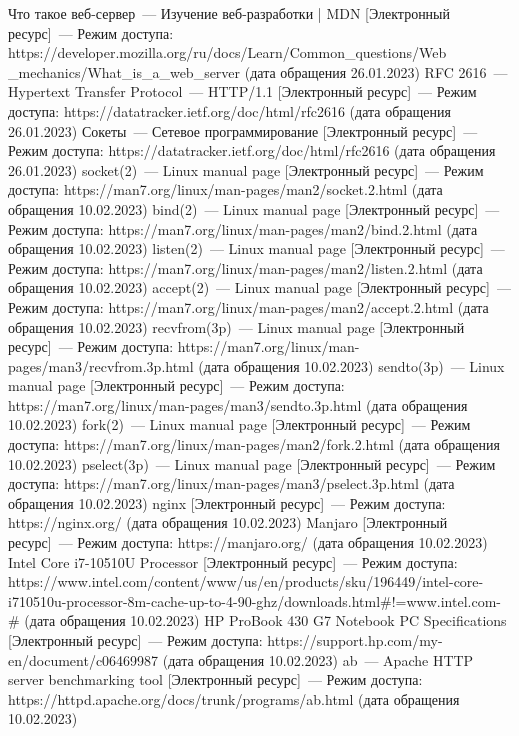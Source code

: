 \begin{thebibliography}{}
	 Что такое веб-сервер~--- Изучение веб-разработки | MDN [Электронный ресурс]~--- Режим доступа: https://developer.mozilla.org/ru/docs/Learn/Common\_questions/Web\\\_mechanics/What\_is\_a\_web\_server (дата обращения 26.01.2023)
	 RFC 2616~--- Hypertext Transfer Protocol~--- HTTP/1.1 [Электронный ресурс]~--- Режим доступа: https://datatracker.ietf.org/doc/html/rfc2616 (дата обращения 26.01.2023)
	 Сокеты~--- Сетевое программирование [Электронный ресурс]~--- Режим доступа: https://datatracker.ietf.org/doc/html/rfc2616 (дата обращения 26.01.2023)
	 socket(2)~--- Linux manual page [Электронный ресурс]~--- Режим доступа: https://man7.org/linux/man-pages/man2/socket.2.html (дата обращения 10.02.2023)
	 bind(2)~--- Linux manual page [Электронный ресурс]~--- Режим доступа: https://man7.org/linux/man-pages/man2/bind.2.html (дата обращения 10.02.2023)
	 listen(2)~--- Linux manual page [Электронный ресурс]~--- Режим доступа: https://man7.org/linux/man-pages/man2/listen.2.html (дата обращения 10.02.2023)
	 accept(2)~--- Linux manual page [Электронный ресурс]~--- Режим доступа: https://man7.org/linux/man-pages/man2/accept.2.html (дата обращения 10.02.2023)
	 recvfrom(3p)~--- Linux manual page [Электронный ресурс]~--- Режим доступа: https://man7.org/linux/man-pages/man3/recvfrom.3p.html (дата обращения 10.02.2023)
	 sendto(3p)~--- Linux manual page [Электронный ресурс]~--- Режим доступа: https://man7.org/linux/man-pages/man3/sendto.3p.html (дата обращения 10.02.2023)
	 fork(2)~--- Linux manual page [Электронный ресурс]~--- Режим доступа: https://man7.org/linux/man-pages/man2/fork.2.html (дата обращения 10.02.2023)
	 pselect(3p)~--- Linux manual page [Электронный ресурс]~--- Режим доступа: https://man7.org/linux/man-pages/man3/pselect.3p.html (дата обращения 10.02.2023)
	 nginx [Электронный ресурс]~--- Режим доступа: https://nginx.org/ (дата обращения 10.02.2023)
	 Manjaro [Электронный ресурс]~--- Режим доступа: https://manjaro.org/ (дата обращения 10.02.2023)
	 Intel Core i7-10510U Processor [Электронный ресурс]~--- Режим доступа: https://www.intel.com/content/www/us/en/products/sku/196449/intel-core-i710510u-processor-8m-cache-up-to-4-90-ghz/downloads.html\#!=www.intel.com-\#  (дата обращения 10.02.2023)
	 HP ProBook 430 G7 Notebook PC Specifications [Электронный ресурс]~--- Режим доступа: https://support.hp.com/my-en/document/c06469987 (дата обращения 10.02.2023)
	 ab~--- Apache HTTP server benchmarking tool [Электронный ресурс]~--- Режим доступа: https://httpd.apache.org/docs/trunk/programs/ab.html (дата обращения 10.02.2023)
\end{thebibliography}
